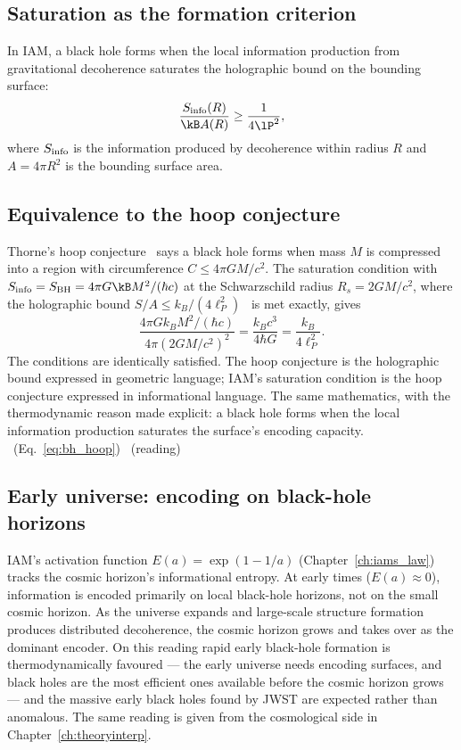 \subsection{Saturation as the formation criterion}
In IAM, a black hole forms when the local information production from gravitational decoherence saturates the holographic bound on the bounding
surface:
\begin{equation}
\frac{S_{\rm info}(R)}{\kB A(R)}\ge\frac{1}{4\lP^2},\label{eq:bh_saturation}
\end{equation}
where $S_{\rm info}$ is the information produced by decoherence within radius $R$ and $A=4\pi R^2$ is the bounding surface area. \conjecture

\subsection{Equivalence to the hoop conjecture}
Thorne's hoop conjecture~\cite{Thorne1972} says a black hole forms when mass $M$ is compressed into a region with circumference $C\le4\pi GM/c^2$. The saturation
condition with $S_{\rm info}=S_{\rm BH}=4\pi G\kB M^2/(\hbar c)$ at the Schwarzschild radius $R_s=2GM/c^2$, where the holographic bound
$S/A\le k_B/(4\ell_P^2)$~\cite{Bousso2002} is met exactly, gives
\begin{equation}
\frac{4\pi Gk_BM^2/(\hbar c)}{4\pi(2GM/c^2)^2}=\frac{k_Bc^3}{4\hbar G}=\frac{k_B}{4\ell_P^2}.\label{eq:bh_hoop}
\end{equation}
The conditions are identically satisfied. The hoop conjecture is the holographic bound expressed in geometric language; IAM's saturation condition is the
hoop conjecture expressed in informational language. The same mathematics, with the thermodynamic reason made explicit: a black hole forms when the
local information production saturates the surface's encoding capacity. \derived\ (Eq.~\eqref{eq:bh_hoop}) \interp\ (reading)

\subsection{Early universe: encoding on black-hole horizons}
IAM's activation function $E(a)=\exp(1-1/a)$ (Chapter~\ref{ch:iams_law}) tracks the cosmic horizon's informational entropy. At early times ($E(a)\approx0$),
information is encoded primarily on local black-hole horizons, not on the small cosmic horizon. As the universe expands and large-scale structure formation
produces distributed decoherence, the cosmic horizon grows and takes over as the dominant encoder. On this reading rapid early black-hole formation is
thermodynamically favoured --- the early universe needs encoding surfaces, and black holes are the most efficient ones available before the cosmic horizon
grows --- and the massive early black holes found by JWST are expected rather than anomalous. The same reading is given from the cosmological
side in Chapter~\ref{ch:theoryinterp}. \conjecture

